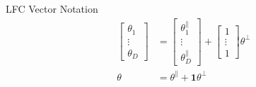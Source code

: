 \documentclass{beamer}
\begin{document}
\begin{frame}[label={sec:orgc8a7a84}]{LFC Vector Notation}
\begin{align*}
  \begin{bmatrix} \theta_1 \\ \vdots \\ \theta_D \end{bmatrix} &= \begin{bmatrix} \theta^\parallel_1 \\ \vdots \\ \theta^\parallel_D \end{bmatrix} + \begin{bmatrix} 1 \\ \vdots \\ 1 \end{bmatrix} \theta^\perp \\
  \theta &= \theta^\parallel + \pmb{1}\theta^\perp
\end{align*}
\end{frame}
\end{document}
